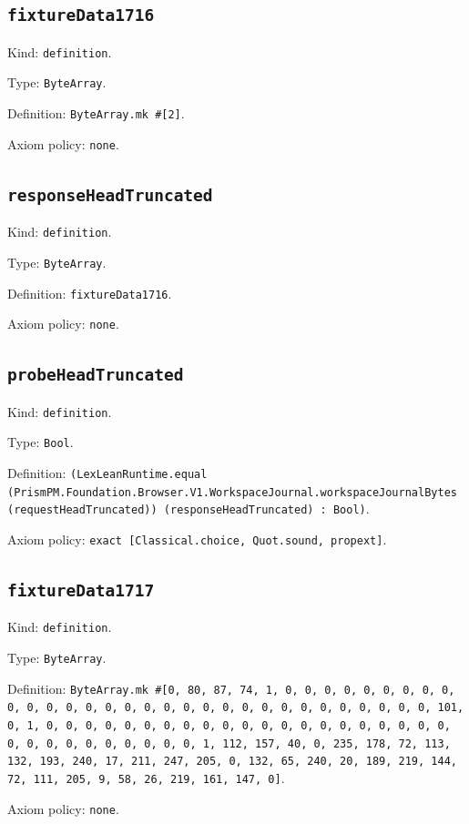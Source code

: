 \documentclass[11pt]{article}
\begin{document}
\subsection*{\texttt{fixtureData1716}}
\noindent Kind: \texttt{definition}.\par
\noindent Type: \texttt{ByteArray}.\par
\noindent Definition: \texttt{ByteArray.mk \#[2]}.\par
\noindent Axiom policy: \texttt{none}.\par
\subsection*{\texttt{responseHeadTruncated}}
\noindent Kind: \texttt{definition}.\par
\noindent Type: \texttt{ByteArray}.\par
\noindent Definition: \texttt{fixtureData1716}.\par
\noindent Axiom policy: \texttt{none}.\par
\subsection*{\texttt{probeHeadTruncated}}
\noindent Kind: \texttt{definition}.\par
\noindent Type: \texttt{Bool}.\par
\noindent Definition: \texttt{(LexLeanRuntime.equal (PrismPM.Foundation.Browser.V1.WorkspaceJournal.workspaceJournalBytes (requestHeadTruncated)) (responseHeadTruncated) : Bool)}.\par
\noindent Axiom policy: \texttt{exact [Classical.choice, Quot.sound, propext]}.\par
\subsection*{\texttt{fixtureData1717}}
\noindent Kind: \texttt{definition}.\par
\noindent Type: \texttt{ByteArray}.\par
\noindent Definition: \texttt{ByteArray.mk \#[0, 80, 87, 74, 1, 0, 0, 0, 0, 0, 0, 0, 0, 0, 0, 0, 0, 0, 0, 0, 0, 0, 0, 0, 0, 0, 0, 0, 0, 0, 0, 0, 0, 0, 0, 0, 101, 0, 1, 0, 0, 0, 0, 0, 0, 0, 0, 0, 0, 0, 0, 0, 0, 0, 0, 0, 0, 0, 0, 0, 0, 0, 0, 0, 0, 0, 0, 0, 0, 0, 1, 112, 157, 40, 0, 235, 178, 72, 113, 132, 193, 240, 17, 211, 247, 205, 0, 132, 65, 240, 20, 189, 219, 144, 72, 111, 205, 9, 58, 26, 219, 161, 147, 0]}.\par
\noindent Axiom policy: \texttt{none}.\par
\end{document}
